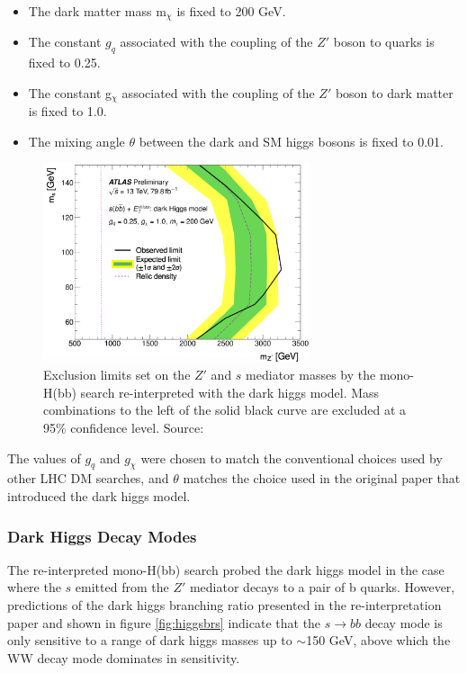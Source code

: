\documentclass[12pt]{article}
\begin{document}
\begin{itemize}
\item The dark matter mass m$_\chi$ is fixed to 200 GeV.
\item The constant $g_q$ associated with the coupling of the $Z'$ boson to quarks is fixed to 0.25.
\item The constant g$_\chi$ associated with the coupling of the $Z'$ boson to dark matter is fixed to 1.0.
\item The mixing angle $\theta$ between the dark and SM higgs bosons is fixed to 0.01.
\end{itemize}

\begin{figure}[H]
	\centering
	\includegraphics[width=0.7\textwidth]{figures/monosbb_exclusion.png}
	\caption[]{Exclusion limits set on the $Z'$ and $s$ mediator masses by the mono-H(bb) search re-interpreted with the dark higgs model. Mass combinations to the left of the solid black curve are excluded at a 95\% confidence level. Source: \cite{monohbb_recast}}
	\label{fig:monosbb_exclusion}
\end{figure}

The values of $g_q$ and $g_\chi$ were chosen to match the conventional choices used by other LHC DM searches, and $\theta$ matches the choice used in the original paper \cite{dark_higgs} that introduced the dark higgs model.

\subsubsection{Dark Higgs Decay Modes}

The re-interpreted mono-H(bb) search probed the dark higgs model in the case where the $s$ emitted from the $Z'$ mediator decays to a pair of b quarks. However, predictions of the dark higgs branching ratio presented in the re-interpretation paper \cite{monohbb_recast} and shown in figure \ref{fig:higgsbrs} indicate that the $s \rightarrow bb$ decay mode is only sensitive to a range of dark higgs masses up to $\sim$150 GeV, above which the WW decay mode dominates in sensitivity. 
\end{document}
